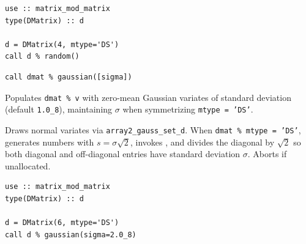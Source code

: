 \lstset{language=[95]Fortran}
\begin{lstlisting}
use :: matrix_mod_matrix
type(DMatrix) :: d

d = DMatrix(4, mtype='DS')
call d % random()
\end{lstlisting}


\lstset{language=[95]Fortran}
\begin{lstlisting}
call dmat % gaussian([sigma])
\end{lstlisting}

Populates \texttt{dmat \% v} with zero-mean Gaussian variates of standard deviation  (default \texttt{1.0\_8}), maintaining $\sigma$ when symmetrizing \texttt{mtype = 'DS'}.

Draws normal variates via \texttt{array2\_gauss\_set\_d}. When \texttt{dmat \% mtype = 'DS'}, generates numbers with $s = \sigma\sqrt{2}$, invokes , and divides the diagonal by $\sqrt{2}$ so both diagonal and off-diagonal entries have standard deviation $\sigma$. Aborts if unallocated.

\begin{description}[leftmargin=2.2cm, style=nextline]
\end{description}

\lstset{language=[95]Fortran}
\begin{lstlisting}
use :: matrix_mod_matrix
type(DMatrix) :: d

d = DMatrix(6, mtype='DS')
call d % gaussian(sigma=2.0_8)
\end{lstlisting}


